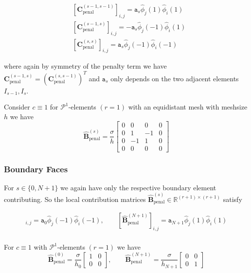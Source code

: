 \begin{align*}
	 & [\textbf{C}_{\text{penal}}^{(s-1,s-1)}]_{i,j} = \texttt{a}_s \widehat{\phi}_j(1) \widehat{\phi}_i(1) \\
	 & [\textbf{C}_{\text{penal}}^{(s-1,s)}]_{i,j} = -\texttt{a}_s \widehat{\phi}_j(-1) \widehat{\phi}_i(1) \\
	 & [\textbf{C}_{\text{penal}}^{(s,s)}]_{i,j} = \texttt{a}_s \widehat{\phi}_j(-1) \widehat{\phi}_i(-1)
\end{align*}

where again by symmetry of the penalty term we have
$ \textbf{C}_{\text{penal}}^{(s-1,s)} = (\textbf{C}_{\text{penal}}^{(s,s-1)})^T$
and $\texttt{a}_s$ only depends on the two adjacent elements $I_{s-1}, I_s$.

\begin{example}
	Consider $c\equiv 1$ for $\mathcal{P}^1$-elements $(r=1)$
	with an equidistant mesh with meshsize $h$ we have
	\begin{equation*}
		\widehat{\textbf{B}}_{\text{penal}}^{(s)} = \frac{\sigma}{h}
		\begin{bmatrix}
			0 & 0  & 0  & 0 \\
			0 & 1  & -1 & 0 \\
			0 & -1 & 1  & 0 \\
			0 & 0  & 0  & 0
		\end{bmatrix}
	\end{equation*}
\end{example}

\subsubsection{Boundary Faces}
For $s \in  \{0, N+1\} $ we again have only the respective boundary element contributing.
So the local contribution matrices $ \widehat{\textbf{B}}_{\text{penal}}^{(s)} \in \mathbb{R}^{(r+1) \times (r+1)} $ satisfy

\begin{align*}
	[\widehat{\textbf{B}}_{\text{penal}}^{(0)}]_{i,j} =
	\texttt{a}_0 \widehat{\phi}_j(-1) \widehat{\phi}_i(-1), \qquad
	[\widehat{\textbf{B}}_{\text{penal}}^{(N+1)}]_{i,j} =
	\texttt{a}_{N+1} \widehat{\phi}_j(1) \widehat{\phi}_i(1) \\
\end{align*}

\begin{example}
	For $c\equiv 1$ with $\mathcal{P}^1$-elements $(r=1)$ we have
	\begin{equation*}
		\widehat{\textbf{B}}_{\text{penal}}^{(0)} = \frac{\sigma}{h_0}
		\begin{bmatrix}
			1 & 0 \\
			0 & 0
		\end{bmatrix}
		,\qquad
		\widehat{\textbf{B}}_{\text{penal}}^{(N+1)} = \frac{\sigma}{h_{N+1}}
		\begin{bmatrix}
			0 & 0 \\
			0 & 1
		\end{bmatrix}
	\end{equation*}
\end{example}

